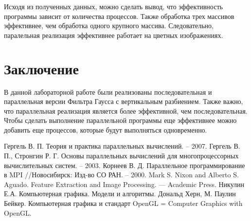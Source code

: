 \documentclass{report}
\begin{document}
\par Исходя из полученных данных, можно сделать вывод, что эффективность программы зависит от количества процессов. Также обработка трех массивов эффективнее, чем обработка одного крупного массива. Следовательно, паралельная реализация эффективнее работает на цветных изображениях. 
\newpage

\section*{Заключение}
В данной лабораторной работе были реализованы последовательная и параллельная версии Фильтра Гаусса с вертикальным разбиением. Также важно, что параллельная реализация является более эффективной, чем последовательная. Чтобы сделать выполнение параллельной программы еще эффективнее можно добавить еще процессов, которые будут выполняться одновременно.

\newpage

\begin{thebibliography}{1}
Гергель В. П. Теория и практика параллельных вычислений. – 2007. 
Гергель В. П., Стронгин Р. Г. Основы параллельных вычислений для многопроцессорных вычислительных систем. – 2003.
Корнеев В. Д. Параллельное программирование в MPI //Новосибирск: Изд-во СО РАН. – 2000.
Mark S. Nixon and Alberto S. Aguado. Feature Extraction and Image Processing. — Academic Press.
Никулин Е.А. Компьютерная графика. Модели и алгоритмы.
Дональд Херн, М. Паулин Бейкер. Компьютерная графика и стандарт OpenGL = Computer Graphics with OpenGL.
\end{thebibliography}
\newpage

\end{document}
